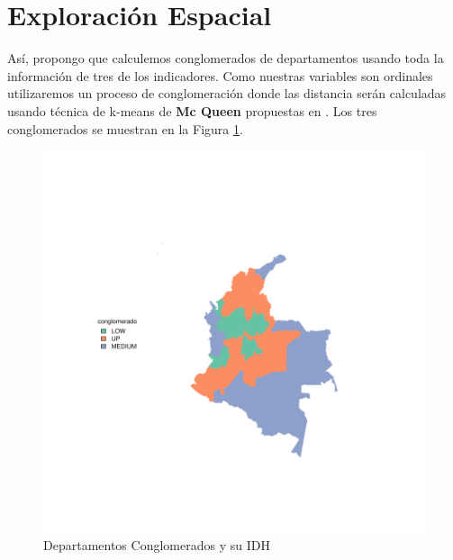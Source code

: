 \documentclass{article}
\begin{document}
\clearpage

\section{Exploración Espacial}



Así, propongo que calculemos conglomerados de departamentos usando toda la información de tres de los indicadores. Como nuestras variables son ordinales utilizaremos un proceso de conglomeración donde las distancia serán calculadas usando técnica de k-means de {\bf Mc Queen} propuestas en \cite{macqueen_methods_nodate}. Los tres conglomerados se muestran en la Figura \ref{clustmap}.







\begin{figure}[h]
\centering

\includegraphics{proyectoLatex-plotMap1}
\caption{Departamentos Conglomerados y su IDH}\label{clustmap}
\end{figure}


\renewcommand{\refname}{Bibliografia}

\end{document}

